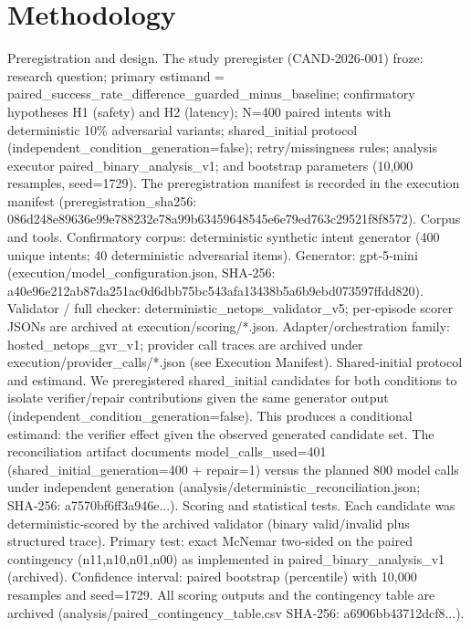 \documentclass[conference]{IEEEtran}
\begin{document}
\section{Methodology}
Preregistration and design. The study preregister (CAND‑2026‑001) froze: research question; primary estimand = paired\_success\_rate\_difference\_guarded\_minus\_baseline; confirmatory hypotheses H1 (safety) and H2 (latency); N=400 paired intents with deterministic 10\% adversarial variants; shared\_initial protocol (independent\_condition\_generation=false); retry/missingness rules; analysis executor paired\_binary\_analysis\_v1; and bootstrap parameters (10,000 resamples, seed=1729). The preregistration manifest is recorded in the execution manifest (preregistration\_sha256: 086d248e89636e99e788232e78a99b63459648545e6e79ed763c29521f8f8572).
Corpus and tools. Confirmatory corpus: deterministic synthetic intent generator (400 unique intents; 40 deterministic adversarial items). Generator: gpt‑5‑mini (execution/model\_configuration.json, SHA‑256: a40e96e212ab87da251ac0d6dbb75bc543afa13438b5a6b9ebd073597ffdd820). Validator / full checker: deterministic\_netops\_validator\_v5; per‑episode scorer JSONs are archived at execution/scoring/*.json. Adapter/orchestration family: hosted\_netops\_gvr\_v1; provider call traces are archived under execution/provider\_calls/*.json (see Execution Manifest).
Shared‑initial protocol and estimand. We preregistered shared\_initial candidates for both conditions to isolate verifier/repair contributions given the same generator output (independent\_condition\_generation=false). This produces a conditional estimand: the verifier effect given the observed generated candidate set. The reconciliation artifact documents model\_calls\_used=401 (shared\_initial\_generation=400 + repair=1) versus the planned 800 model calls under independent generation (analysis/deterministic\_reconciliation.json; SHA‑256: a7570bf6ff3a946e...).
Scoring and statistical tests. Each candidate was deterministic‑scored by the archived validator (binary valid/invalid plus structured trace). Primary test: exact McNemar two‑sided on the paired contingency (n11,n10,n01,n00) as implemented in paired\_binary\_analysis\_v1 (archived). Confidence interval: paired bootstrap (percentile) with 10,000 resamples and seed=1729. All scoring outputs and the contingency table are archived (analysis/paired\_contingency\_table.csv SHA‑256: a6906bb43712dcf8...).
\end{document}
